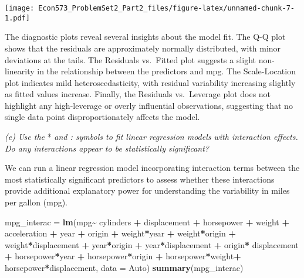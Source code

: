 \documentclass[
]{article}
\newenvironment{Shaded}{\begin{snugshade}}{\end{snugshade}}
\newcommand{\AttributeTok}[1]{\textcolor[rgb]{0.13,0.29,0.53}{#1}}
\newcommand{\FunctionTok}[1]{\textcolor[rgb]{0.13,0.29,0.53}{\textbf{#1}}}
\newcommand{\NormalTok}[1]{#1}
\newcommand{\OtherTok}[1]{\textcolor[rgb]{0.56,0.35,0.01}{#1}}
\newcommand{\SpecialCharTok}[1]{\textcolor[rgb]{0.81,0.36,0.00}{\textbf{#1}}}
\begin{document}
\texttt{[image: Econ573\_ProblemSet2\_Part2\_files/figure-latex/unnamed-chunk-7-1.pdf]}

The diagnostic plots reveal several insights about the model fit. The
Q-Q plot shows that the residuals are approximately normally
distributed, with minor deviations at the tails. The Residuals
vs.~Fitted plot suggests a slight non-linearity in the relationship
between the predictors and mpg. The Scale-Location plot indicates mild
heteroscedasticity, with residual variability increasing slightly as
fitted values increase. Finally, the Residuals vs.~Leverage plot does
not highlight any high-leverage or overly influential observations,
suggesting that no single data point disproportionately affects the
model.

\emph{(e) Use the} * \emph{and : symbols to fit linear regression models
with interaction effects. Do any interactions appear to be statistically
significant?}

We can run a linear regression model incorporating interaction terms
between the most statistically significant predictors to assess whether
these interactions provide additional explanatory power for
understanding the variability in miles per gallon (mpg).

\begin{Shaded}
\begin{Highlighting}[]
\NormalTok{mpg\_interac }\OtherTok{=} \FunctionTok{lm}\NormalTok{(mpg}\SpecialCharTok{\textasciitilde{}}\NormalTok{ cylinders }\SpecialCharTok{+}\NormalTok{ displacement }\SpecialCharTok{+}\NormalTok{ horsepower }\SpecialCharTok{+}\NormalTok{ weight }\SpecialCharTok{+}\NormalTok{ acceleration }\SpecialCharTok{+}\NormalTok{ year }\SpecialCharTok{+}\NormalTok{ origin }\SpecialCharTok{+}\NormalTok{ weight}\SpecialCharTok{*}\NormalTok{year }\SpecialCharTok{+}\NormalTok{ weight}\SpecialCharTok{*}\NormalTok{origin }\SpecialCharTok{+}\NormalTok{ weight}\SpecialCharTok{*}\NormalTok{displacement }\SpecialCharTok{+}\NormalTok{ year}\SpecialCharTok{*}\NormalTok{origin }\SpecialCharTok{+}\NormalTok{ year}\SpecialCharTok{*}\NormalTok{displacement }\SpecialCharTok{+}\NormalTok{ origin}\SpecialCharTok{*}\NormalTok{ displacement }\SpecialCharTok{+}\NormalTok{ horsepower}\SpecialCharTok{*}\NormalTok{year }\SpecialCharTok{+}\NormalTok{ horsepower}\SpecialCharTok{*}\NormalTok{origin }\SpecialCharTok{+}\NormalTok{ horsepower}\SpecialCharTok{*}\NormalTok{weight}\SpecialCharTok{+}\NormalTok{ horsepower}\SpecialCharTok{*}\NormalTok{displacement, }\AttributeTok{data =}\NormalTok{ Auto)}
\FunctionTok{summary}\NormalTok{(mpg\_interac)}
\end{Highlighting}
\end{Shaded}
\end{document}
